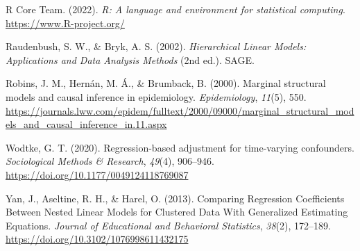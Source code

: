 \documentclass[
  12pt,
  a4paper,
]{article}
\newlength{\cslhangindent}
\newlength{\cslentryspacingunit} %
\newenvironment{CSLReferences}[2] %
 {%
  \setlength{\parindent}{0pt}
  \ifodd #1
  \let\oldpar\par
  \def\par{\hangindent=\cslhangindent\oldpar}
  \fi
  \setlength{\parskip}{#2\cslentryspacingunit}
 }%
 {}
\begin{document}
\begin{CSLReferences}{1}{0}
\leavevmode{}%
R Core Team. (2022). \emph{R: A language and environment for statistical
computing}. \url{https://www.R-project.org/}

\leavevmode{}%
Raudenbush, S. W., \& Bryk, A. S. (2002). \emph{Hierarchical Linear
Models: Applications and Data Analysis Methods} (2nd ed.). SAGE.

\leavevmode{}%
Robins, J. M., Hernán, M. Á., \& Brumback, B. (2000). Marginal
structural models and causal inference in epidemiology.
\emph{Epidemiology}, \emph{11}(5), 550.
\url{https://journals.lww.com/epidem/fulltext/2000/09000/marginal_structural_models_and_causal_inference_in.11.aspx}

\leavevmode{}%
Wodtke, G. T. (2020). Regression-based adjustment for time-varying
confounders. \emph{Sociological Methods \& Research}, \emph{49}(4),
906--946. \url{https://doi.org/10.1177/0049124118769087}

\leavevmode{}%
Yan, J., Aseltine, R. H., \& Harel, O. (2013). Comparing Regression
Coefficients Between Nested Linear Models for Clustered Data With
Generalized Estimating Equations. \emph{Journal of Educational and
Behavioral Statistics}, \emph{38}(2), 172--189.
\url{https://doi.org/10.3102/1076998611432175}

\end{CSLReferences}
\end{document}
